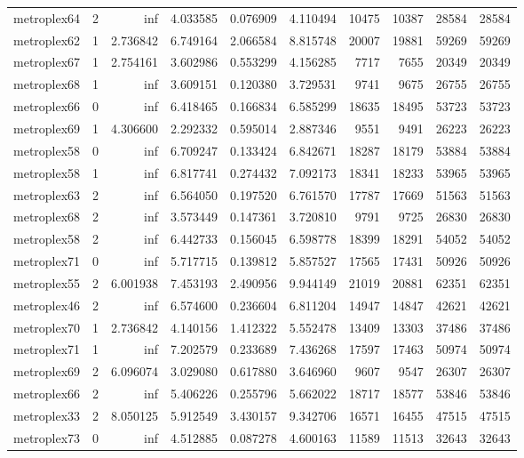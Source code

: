 \begin{longtable}{|l|r|r|r|r|r|r|r|r|r|}
metroplex64 & 2 & inf & 4.033585 & 0.076909 & 4.110494 & 10475 & 10387 & 28584 & 28584 \\
metroplex62 & 1 & 2.736842 & 6.749164 & 2.066584 & 8.815748 & 20007 & 19881 & 59269 & 59269 \\
metroplex67 & 1 & 2.754161 & 3.602986 & 0.553299 & 4.156285 & 7717 & 7655 & 20349 & 20349 \\
metroplex68 & 1 & inf & 3.609151 & 0.120380 & 3.729531 & 9741 & 9675 & 26755 & 26755 \\
metroplex66 & 0 & inf & 6.418465 & 0.166834 & 6.585299 & 18635 & 18495 & 53723 & 53723 \\
metroplex69 & 1 & 4.306600 & 2.292332 & 0.595014 & 2.887346 & 9551 & 9491 & 26223 & 26223 \\
metroplex58 & 0 & inf & 6.709247 & 0.133424 & 6.842671 & 18287 & 18179 & 53884 & 53884 \\
metroplex58 & 1 & inf & 6.817741 & 0.274432 & 7.092173 & 18341 & 18233 & 53965 & 53965 \\
metroplex63 & 2 & inf & 6.564050 & 0.197520 & 6.761570 & 17787 & 17669 & 51563 & 51563 \\
metroplex68 & 2 & inf & 3.573449 & 0.147361 & 3.720810 & 9791 & 9725 & 26830 & 26830 \\
metroplex58 & 2 & inf & 6.442733 & 0.156045 & 6.598778 & 18399 & 18291 & 54052 & 54052 \\
metroplex71 & 0 & inf & 5.717715 & 0.139812 & 5.857527 & 17565 & 17431 & 50926 & 50926 \\
metroplex55 & 2 & 6.001938 & 7.453193 & 2.490956 & 9.944149 & 21019 & 20881 & 62351 & 62351 \\
metroplex46 & 2 & inf & 6.574600 & 0.236604 & 6.811204 & 14947 & 14847 & 42621 & 42621 \\
metroplex70 & 1 & 2.736842 & 4.140156 & 1.412322 & 5.552478 & 13409 & 13303 & 37486 & 37486 \\
metroplex71 & 1 & inf & 7.202579 & 0.233689 & 7.436268 & 17597 & 17463 & 50974 & 50974 \\
metroplex69 & 2 & 6.096074 & 3.029080 & 0.617880 & 3.646960 & 9607 & 9547 & 26307 & 26307 \\
metroplex66 & 2 & inf & 5.406226 & 0.255796 & 5.662022 & 18717 & 18577 & 53846 & 53846 \\
metroplex33 & 2 & 8.050125 & 5.912549 & 3.430157 & 9.342706 & 16571 & 16455 & 47515 & 47515 \\
metroplex73 & 0 & inf & 4.512885 & 0.087278 & 4.600163 & 11589 & 11513 & 32643 & 32643 \\

\end{longtable}
